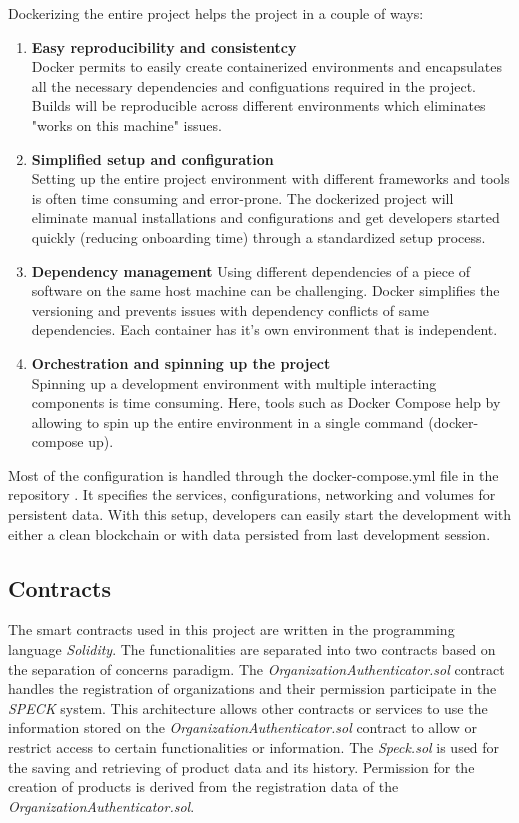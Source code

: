 \documentclass[oneside,a4paper,12pt, colorinlistoftodos]{article} %
\begin{document}
Dockerizing the entire project helps the project in a couple of ways:
\begin{enumerate}
    \item \textbf{Easy reproducibility and consistentcy}\\
    Docker permits to easily create containerized environments and encapsulates all the necessary dependencies and configuations required in the project. Builds will be reproducible across different environments which eliminates "works on this machine" issues.
    \item \textbf{Simplified setup and configuration}\\
    Setting up the entire project environment with different frameworks and tools is often time consuming and error-prone. The dockerized project will eliminate manual installations and configurations and get developers started quickly (reducing onboarding time) through a standardized setup process.
    \item \textbf{Dependency management}
    Using different dependencies of a piece of software on the same host machine can be challenging. Docker simplifies the versioning and prevents issues with dependency conflicts of same dependencies. Each container has it's own environment that is independent.
    \item \textbf{Orchestration and spinning up the project}\\
    Spinning up a development environment with multiple interacting components is time consuming. Here, tools such as Docker Compose help by allowing to spin up the entire environment in a single command (docker-compose up). 
\end{enumerate}

 Most of the configuration is handled through the docker-compose.yml file in the repository \cite{HellerAoun}. It specifies the services, configurations, networking and volumes for persistent data. With this setup, developers can easily start the development with either a clean blockchain or with data persisted from last development session.

\subsection{Contracts}

The smart contracts used in this project are written in the programming language \textit{Solidity}. The functionalities are separated into two contracts based on the separation of concerns paradigm. The \textit{OrganizationAuthenticator.sol} contract handles the registration of organizations and their permission participate in the \textit{SPECK} system. This architecture allows other contracts or services to use the information stored on the \textit{OrganizationAuthenticator.sol} contract  to allow or restrict access to certain functionalities or information. The \textit{Speck.sol} is used for the saving and retrieving of product data and its history. Permission for the creation of products is derived from the registration data of the \textit{OrganizationAuthenticator.sol}.
\end{document}
